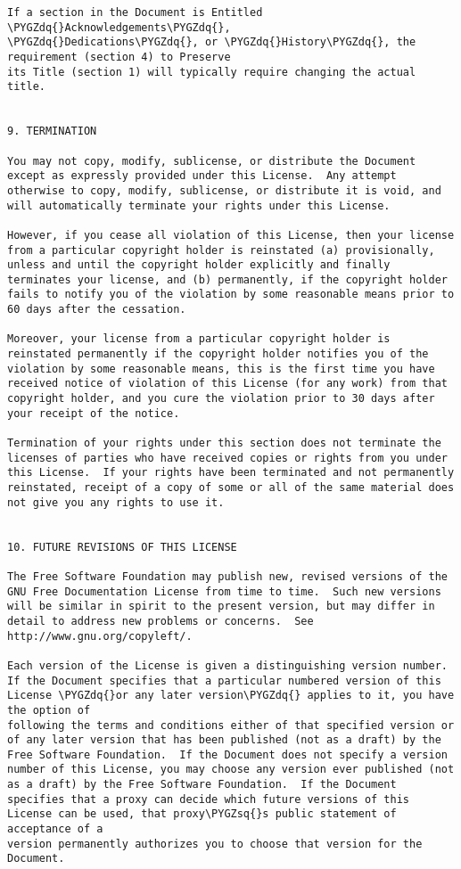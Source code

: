 \documentclass[letterpaper,10pt,english]{sphinxmanual}
\def\PYGZsq{\char`\'}
\def\PYGZdq{\char`\"}
\renewcommand\PYGZsq{\textquotesingle}
\begin{document}
\begin{Verbatim}[frame=single,commandchars=\\\{\}]
If a section in the Document is Entitled \PYGZdq{}Acknowledgements\PYGZdq{},
\PYGZdq{}Dedications\PYGZdq{}, or \PYGZdq{}History\PYGZdq{}, the requirement (section 4) to Preserve
its Title (section 1) will typically require changing the actual
title.


9. TERMINATION

You may not copy, modify, sublicense, or distribute the Document
except as expressly provided under this License.  Any attempt
otherwise to copy, modify, sublicense, or distribute it is void, and
will automatically terminate your rights under this License.

However, if you cease all violation of this License, then your license
from a particular copyright holder is reinstated (a) provisionally,
unless and until the copyright holder explicitly and finally
terminates your license, and (b) permanently, if the copyright holder
fails to notify you of the violation by some reasonable means prior to
60 days after the cessation.

Moreover, your license from a particular copyright holder is
reinstated permanently if the copyright holder notifies you of the
violation by some reasonable means, this is the first time you have
received notice of violation of this License (for any work) from that
copyright holder, and you cure the violation prior to 30 days after
your receipt of the notice.

Termination of your rights under this section does not terminate the
licenses of parties who have received copies or rights from you under
this License.  If your rights have been terminated and not permanently
reinstated, receipt of a copy of some or all of the same material does
not give you any rights to use it.


10. FUTURE REVISIONS OF THIS LICENSE

The Free Software Foundation may publish new, revised versions of the
GNU Free Documentation License from time to time.  Such new versions
will be similar in spirit to the present version, but may differ in
detail to address new problems or concerns.  See
http://www.gnu.org/copyleft/.

Each version of the License is given a distinguishing version number.
If the Document specifies that a particular numbered version of this
License \PYGZdq{}or any later version\PYGZdq{} applies to it, you have the option of
following the terms and conditions either of that specified version or
of any later version that has been published (not as a draft) by the
Free Software Foundation.  If the Document does not specify a version
number of this License, you may choose any version ever published (not
as a draft) by the Free Software Foundation.  If the Document
specifies that a proxy can decide which future versions of this
License can be used, that proxy\PYGZsq{}s public statement of acceptance of a
version permanently authorizes you to choose that version for the
Document.


\end{Verbatim}
\end{document}
